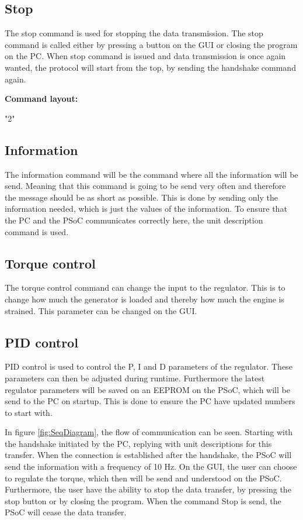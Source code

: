 \subsection{Stop}
The stop command is used for stopping the data transmission. The stop command is called either by pressing a button on the GUI or closing the program on the PC.
When stop command is issued and data transmission is once again wanted, the protocol will start from the top, by sending the handshake command again. 

\textbf{Command layout:}

"2"

\subsection{Information}
The information command will be the command where all the information will be send. Meaning that this command is going to be send very often and therefore the message should be as short as possible. This is done by sending only the information needed, which is just the values of the information. To ensure that the PC and the PSoC communicates correctly here, the unit description command is used. 

\subsection{Torque control}
The torque control command  can change the input to the regulator. This is to change how much the generator is loaded and thereby how much the engine is strained. This parameter can be changed on the GUI. 

\subsection{PID control}
PID control is used to control the P, I and D parameters of the regulator. These parameters can then be adjusted during runtime. Furthermore the latest regulator parameters will be saved on an EEPROM on the PSoC, which will be send to the PC on startup. This is done to ensure the PC have updated numbers to start with.
          

In figure \ref{fig:SeqDiagram}, the flow of communication can be seen.
Starting with the handshake initiated by the PC, replying with unit descriptions for this transfer. When the connection is established after the handshake, the PSoC will send the information with a frequency of 10 Hz. On the GUI, the user can choose to regulate the torque, which then will be send and understood on the PSoC. Furthermore, the user have the ability to stop the data transfer, by pressing the stop button or by closing the program. When the command Stop is send, the PSoC will cease the data transfer.

